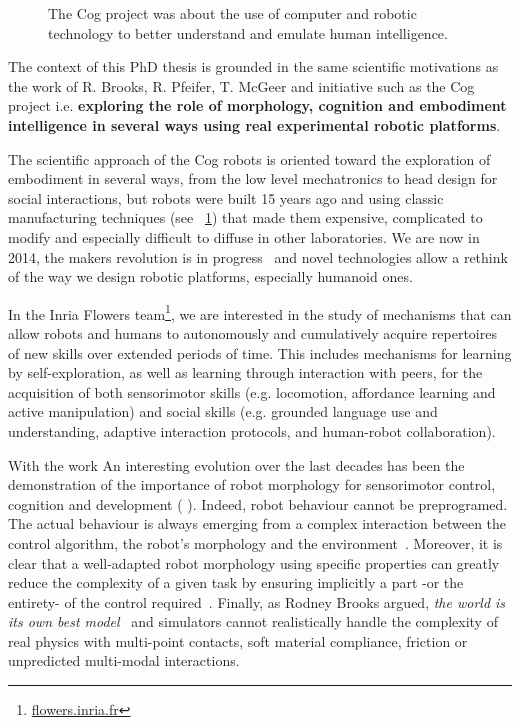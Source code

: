 \begin{figure}[t]
\centering
    \hfil
    \caption{The Cog project was about the use of computer and robotic technology to better understand and emulate human intelligence.}
    \label{fig:cog_project}
\end{figure}


The context of this PhD thesis is grounded in the same scientific motivations as the work of R. Brooks, R. Pfeifer, T. McGeer and initiative such as the Cog project i.e. \textbf{exploring the role of morphology, cognition and embodiment intelligence in several ways using real experimental robotic platforms}.

The scientific approach of the Cog robots is oriented toward the exploration of embodiment in several ways, from the low level mechatronics to head design for social interactions, but robots were built 15 years ago and using classic manufacturing techniques (see \figurename~\ref{fig:cog_project}) that made them expensive, complicated to modify and especially difficult to diffuse in other laboratories.
We are now in 2014, the makers revolution is in progress~\parencite{anderson} and novel technologies allow a rethink of the way we design robotic platforms, especially humanoid ones.


In the Inria Flowers team\footnote{\url{flowers.inria.fr}}, we are interested in the study of mechanisms that can allow robots and humans to autonomously and cumulatively acquire repertoires of new skills over extended periods of time. This includes mechanisms for learning by self-exploration, as well as learning through interaction with peers, for the acquisition of both sensorimotor skills (e.g. locomotion, affordance learning and active manipulation) and social skills (e.g. grounded language use and understanding, adaptive interaction protocols, and human-robot collaboration).

With the work An interesting evolution over the last decades has been the demonstration of the importance of robot morphology for sensorimotor control, cognition and development (\parencite{kaplan2008corps} \parencite{steels1995artificial} \parencite{Pfeifer06}). Indeed, robot behaviour cannot be preprogramed. The actual behaviour is always emerging from a complex interaction between the control algorithm, the robot’s morphology and the environment~\parencite{Steels1991emergence}. Moreover, it is clear that a well-adapted robot morphology using specific properties can greatly reduce the complexity of a given task by ensuring implicitly a part -or the entirety- of the control required~\parencite{pfeifer2005morphological}.
Finally, as Rodney Brooks argued, \emph{the world is its own best model}~\parencite{brooks1991intelligence} and simulators cannot realistically handle the complexity of real physics with multi-point contacts, soft material compliance, friction or unpredicted multi-modal interactions.


